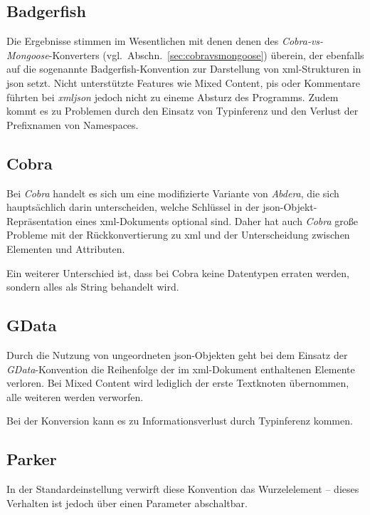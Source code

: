 \subsection{Badgerfish}
\label{sec:xmljson-badgerfish}

Die Ergebnisse stimmen im Wesentlichen mit denen  denen des \emph{Cobra-vs-Mongoose}-Konverters (vgl.~Abschn.~\ref{sec:cobravsmongoose}) überein, der ebenfalls auf die sogenannte Badgerfish-Konvention zur Darstellung von \acrshort{xml}-Strukturen in \acrshort{json} setzt. Nicht unterstützte Features wie Mixed Content, \glspl{pi} oder Kommentare führten bei \emph{xmljson} jedoch nicht zu eineme Absturz des Programms. Zudem kommt es zu Problemen durch den Einsatz von Typinferenz und den Verlust der Prefixnamen von Namespaces.

\subsection{Cobra}
\label{sec:xmljson-cobra}

Bei \emph{Cobra} handelt es sich um eine modifizierte Variante von \emph{Abdera}, die sich hauptsächlich darin unterscheiden, welche Schlüssel in der \acrshort{json}-Objekt-Repräsentation eines \acrshort{xml}-Dokuments optional sind. Daher hat auch \emph{Cobra} große Probleme mit der Rückkonvertierung zu \acrshort{xml} und der Unterscheidung zwischen Elementen und Attributen.

Ein weiterer Unterschied ist, dass bei Cobra keine Datentypen erraten werden, sondern alles als String behandelt wird.

\subsection{GData}
\label{sec:xmljson-gdata}

Durch die Nutzung von ungeordneten \acrshort{json}-Objekten geht bei dem Einsatz der \emph{GData}-Konvention die Reihenfolge der im \acrshort{xml}-Dokument enthaltenen Elemente verloren. Bei Mixed Content wird lediglich der erste Textknoten übernommen, alle weiteren werden verworfen.

Bei der Konversion kann es zu Informationsverlust durch Typinferenz kommen.

\subsection{Parker}
\label{sec:xmljson-parker}

In der Standardeinstellung verwirft diese Konvention das Wurzelelement -- dieses Verhalten ist jedoch über einen Parameter abschaltbar.

